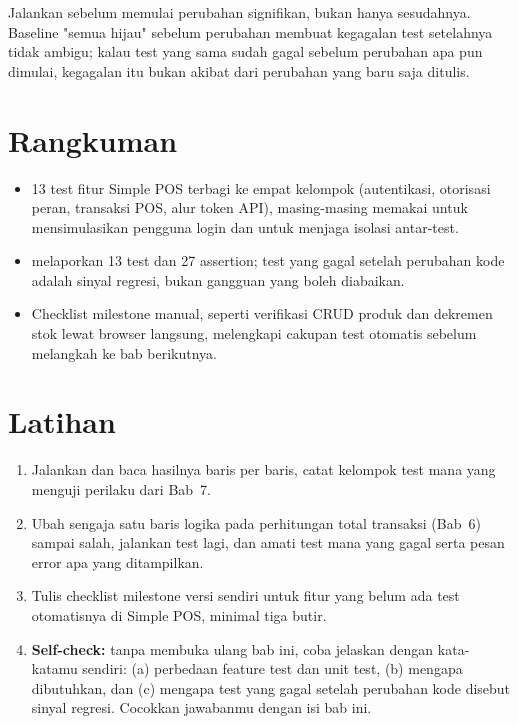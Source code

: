 \begin{tipbox}
Jalankan  sebelum memulai perubahan signifikan,
bukan hanya sesudahnya. Baseline "semua hijau" sebelum perubahan
membuat kegagalan test setelahnya tidak ambigu; kalau test yang sama
sudah gagal sebelum perubahan apa pun dimulai, kegagalan itu bukan
akibat dari perubahan yang baru saja ditulis.
\end{tipbox}


\section{Rangkuman}
\label{sec:pengujian-aplikasi-rangkuman}

\begin{itemize}
  \item 13 test fitur Simple POS terbagi ke empat kelompok
    (autentikasi, otorisasi peran, transaksi POS, alur token API),
    masing-masing memakai  untuk mensimulasikan
    pengguna login dan  untuk menjaga
    isolasi antar-test.
  \item {} melaporkan 13 test dan 27 assertion;
    test yang gagal setelah perubahan kode adalah sinyal regresi,
    bukan gangguan yang boleh diabaikan.
  \item Checklist milestone manual, seperti verifikasi CRUD produk dan
    dekremen stok lewat browser langsung, melengkapi cakupan test
    otomatis sebelum melangkah ke bab berikutnya.
\end{itemize}

\section{Latihan}

\begin{enumerate}
  \item Jalankan  dan baca hasilnya baris per
    baris, catat kelompok test mana yang menguji perilaku dari Bab~7.
  \item Ubah sengaja satu baris logika pada perhitungan total transaksi
    (Bab~6) sampai salah, jalankan test lagi, dan amati test mana yang
    gagal serta pesan error apa yang ditampilkan.
  \item Tulis checklist milestone versi sendiri untuk fitur yang belum
    ada test otomatisnya di Simple POS, minimal tiga butir.
  \item \textbf{Self-check:} tanpa membuka ulang bab ini, coba jelaskan
    dengan kata-katamu sendiri: (a) perbedaan feature test dan unit
    test, (b) mengapa  dibutuhkan, dan (c)
    mengapa test yang gagal setelah perubahan kode disebut sinyal
    regresi. Cocokkan jawabanmu dengan isi bab ini.
\end{enumerate}

